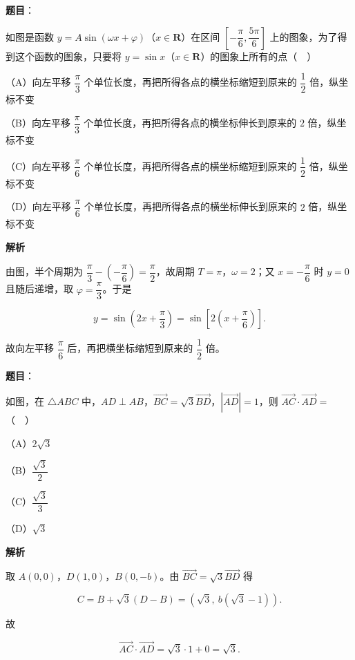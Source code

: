 \begin{answer}

\textbf{题目}：

如图是函数 $y=A\sin(\omega x+\varphi)$（$x\in\mathbf R$）在区间 $\left[-\dfrac\pi6,\dfrac{5\pi}6\right]$ 上的图象，为了得到这个函数的图象，只要将 $y=\sin x$（$x\in\mathbf R$）的图象上所有的点（　）
\nopagebreak[4]
\begin{center}\end{center}
\nopagebreak[4]
（A）向左平移 $\dfrac\pi3$ 个单位长度，再把所得各点的横坐标缩短到原来的 $\dfrac12$ 倍，纵坐标不变

（B）向左平移 $\dfrac\pi3$ 个单位长度，再把所得各点的横坐标伸长到原来的 $2$ 倍，纵坐标不变

（C）向左平移 $\dfrac\pi6$ 个单位长度，再把所得各点的横坐标缩短到原来的 $\dfrac12$ 倍，纵坐标不变

（D）向左平移 $\dfrac\pi6$ 个单位长度，再把所得各点的横坐标伸长到原来的 $2$ 倍，纵坐标不变

\textbf{解析}

由图，半个周期为 $\dfrac\pi3-\left(-\dfrac\pi6\right)=\dfrac\pi2$，故周期 $T=\pi$，$\omega=2$；又 $x=-\dfrac\pi6$ 时 $y=0$ 且随后递增，取 $\varphi=\dfrac\pi3$。于是

\nopagebreak[4]
\[y=\sin\left(2x+\frac\pi3\right)=\sin\left[2\left(x+\frac\pi6\right)\right].\]

故向左平移 $\dfrac\pi6$ 后，再把横坐标缩短到原来的 $\dfrac12$ 倍。


\end{answer}
\begin{answer}

\textbf{题目}：

如图，在 $\triangle ABC$ 中，$AD\perp AB$，$\overrightarrow{BC}=\sqrt3\overrightarrow{BD}$，$|\overrightarrow{AD}|=1$，则 $\overrightarrow{AC}\cdot\overrightarrow{AD}=$（　）
\nopagebreak[4]
\begin{center}\end{center}
\nopagebreak[4]
（A）$2\sqrt3$

（B）$\dfrac{\sqrt3}2$

（C）$\dfrac{\sqrt3}3$

（D）$\sqrt3$

\textbf{解析}

取 $A(0,0)$，$D(1,0)$，$B(0,-b)$。由 $\overrightarrow{BC}=\sqrt3\overrightarrow{BD}$ 得

\nopagebreak[4]
\[C=B+\sqrt3(D-B)=(\sqrt3,\ b(\sqrt3-1)).\]

故

\nopagebreak[4]
\[\overrightarrow{AC}\cdot\overrightarrow{AD}=\sqrt3\cdot1+0=\sqrt3.\]


\end{answer}
